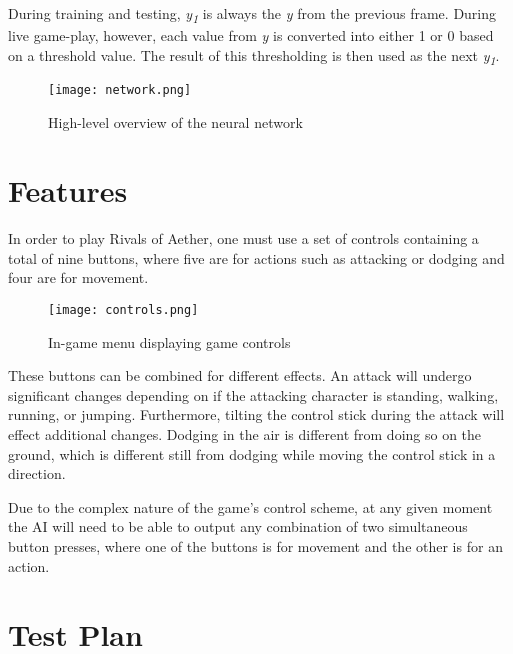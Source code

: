 During training and testing, \textit{y\textsubscript{1}} is always the \textit{y} from the previous frame. During live game-play, however, each value from \textit{y} is converted into either 1 or 0 based on a threshold value. The result of this thresholding is then used as the next \textit{y\textsubscript{1}}.

\begin{figure}
    \caption{High-level overview of the neural network}
    \centering
    \texttt{[image: network.png]} \\
\end{figure}




\section{Features}

In order to play Rivals of Aether, one must use a set of controls containing a total of nine buttons, where five are for actions such as attacking or dodging and four are for movement.

\begin{figure}
	\caption{In-game menu displaying game controls}
	\centering
	\texttt{[image: controls.png]} \\
\end{figure}

These buttons can be combined for different effects. An attack will undergo significant changes depending on if the attacking character is standing, walking, running, or jumping. Furthermore, tilting the control stick during the attack will effect additional changes. Dodging in the air is different from doing so on the ground, which is different still from dodging while moving the control stick in a direction.

Due to the complex nature of the game's control scheme, at any given moment the AI will need to be able to output any combination of two simultaneous button presses, where one of the buttons is for movement and the other is for an action.




\section{Test Plan}

